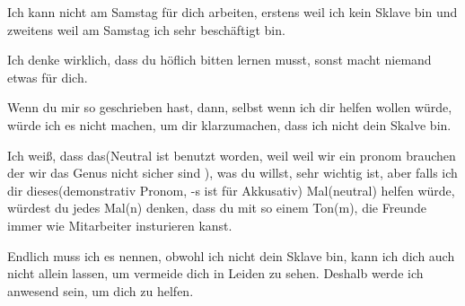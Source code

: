 \documentclass[a4paper]{article}
\title{}
\date{}
\author{Mohammad Rahmani}
\begin{document}
    \maketitle
    Ich kann nicht am Samstag für dich arbeiten, erstens weil ich kein Sklave bin und zweitens weil am Samstag ich sehr beschäftigt bin.
    
    Ich denke wirklich, dass du höflich bitten lernen musst, sonst macht niemand etwas für dich.
    
    Wenn du mir so geschrieben hast, dann, selbst wenn ich dir helfen wollen würde, würde ich es nicht machen, um dir klarzumachen, dass ich nicht dein Skalve bin.
    
    Ich weiß, dass das(Neutral ist benutzt worden, weil weil wir ein pronom brauchen der wir das Genus nicht sicher sind ), was du willst, sehr wichtig ist, aber falls ich dir dieses(demonstrativ Pronom, -s ist für Akkusativ) Mal(neutral) helfen würde, würdest du jedes Mal(n) denken, dass du mit so einem Ton(m), die Freunde immer wie Mitarbeiter insturieren   kanst.
    
    Endlich muss ich es nennen, obwohl ich nicht dein Sklave bin, kann ich dich auch nicht allein lassen, um vermeide dich in Leiden zu sehen. Deshalb werde ich anwesend sein, um dich zu helfen.



    
    
    
    
    
    
    
\end{document}
